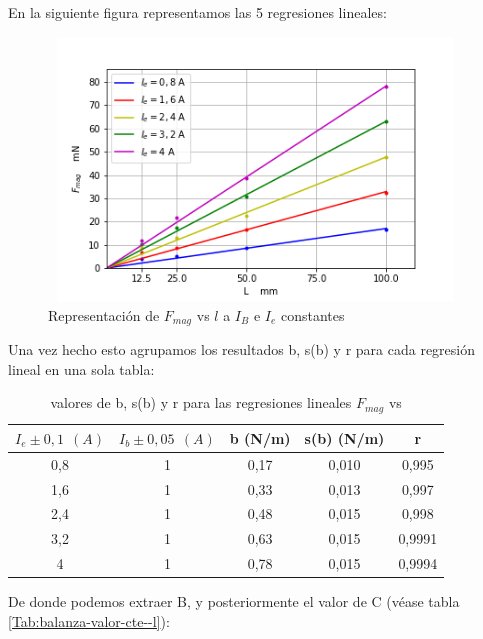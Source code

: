 \documentclass[12pt,a4paper]{book}
\begin{document}
\newpage

En la siguiente figura representamos las 5 regresiones lineales:

\begin{figure}[h!] %
\centering
\includegraphics[width=11cm, height=7cm]{plot2-balanzaelectrodinamica.png}
\caption{Representación de $F_{mag}$ vs $l$ a $I_B$ e $I_e$ constantes}
\label{fig:Plot2-balanzaelectrodinamica}
\end{figure}

Una vez hecho esto agrupamos los resultados b, s(b) y r para cada regresión lineal en una sola tabla:

\begin{table}[h!]
\begin{center}
\begin{tabular}{|c|c|c|c|c|}
\hline
$I_e \pm 0,1 \ \  (A)$ & 	 $I_b \pm 0,05 \ \ (A)$ & 	 b  (N/m) & 	 s(b)   (N/m) & 	 r \\ \hline
0,8 & 	 1 & 	 0,17 & 	 0,010 & 	 0,995 \\ 
1,6 & 	 1 & 	 0,33 & 	 0,013 & 	 0,997 \\ 
2,4 & 	 1 & 	 0,48 & 	 0,015 & 	 0,998 \\ 
3,2 & 	 1 & 	 0,63 & 	 0,015 & 	 0,9991 \\ 
4 & 	 1 & 	 0,78 & 	 0,015 & 	 0,9994 \\ 
\hline
\end{tabular}
\caption{valores de b, s(b) y r para las regresiones lineales $F_{mag}$ vs }
\end{center}
\end{table}

De donde podemos extraer B, y posteriormente el valor de C (véase tabla \ref{Tab:balanza-valor-cte--l}):
\end{document}
